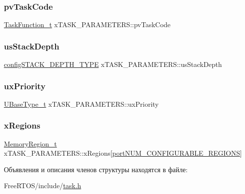 \subsubsection{\texorpdfstring{pvTaskCode}{pvTaskCode}}
{\footnotesize\ttfamily \mbox{\hyperlink{projdefs_8h_a9b32502ff92c255c686dacde53c1cba0}{Task\+Function\+\_\+t}} x\+T\+A\+S\+K\+\_\+\+P\+A\+R\+A\+M\+E\+T\+E\+R\+S\+::pv\+Task\+Code}

\mbox{\label{structx_t_a_s_k___p_a_r_a_m_e_t_e_r_s_ac2edb442cd1a9dc5435c7735ed99c83e}} 
\subsubsection{\texorpdfstring{usStackDepth}{usStackDepth}}
{\footnotesize\ttfamily \mbox{\hyperlink{_free_r_t_o_s_8h_ae4e85bffd36d76cf2796092f0ccd784a}{config\+S\+T\+A\+C\+K\+\_\+\+D\+E\+P\+T\+H\+\_\+\+T\+Y\+PE}} x\+T\+A\+S\+K\+\_\+\+P\+A\+R\+A\+M\+E\+T\+E\+R\+S\+::us\+Stack\+Depth}

\mbox{\label{structx_t_a_s_k___p_a_r_a_m_e_t_e_r_s_aa1aff14035db645e2bdcc85b3cdc9bab}} 
\subsubsection{\texorpdfstring{uxPriority}{uxPriority}}
{\footnotesize\ttfamily \mbox{\hyperlink{portmacro_8h_a646f89d4298e4f5afd522202b11cb2e6}{U\+Base\+Type\+\_\+t}} x\+T\+A\+S\+K\+\_\+\+P\+A\+R\+A\+M\+E\+T\+E\+R\+S\+::ux\+Priority}

\mbox{\label{structx_t_a_s_k___p_a_r_a_m_e_t_e_r_s_ae8b97c6b7a344bf09b066b0844844d66}} 
\subsubsection{\texorpdfstring{xRegions}{xRegions}}
{\footnotesize\ttfamily \mbox{\hyperlink{task_8h_af609504de4d78ff6f71477ae47c66e51}{Memory\+Region\+\_\+t}} x\+T\+A\+S\+K\+\_\+\+P\+A\+R\+A\+M\+E\+T\+E\+R\+S\+::x\+Regions\mbox{[}\mbox{\hyperlink{portable_8h_aca7e1a8a568a38b74cc9db10c8efebda}{port\+N\+U\+M\+\_\+\+C\+O\+N\+F\+I\+G\+U\+R\+A\+B\+L\+E\+\_\+\+R\+E\+G\+I\+O\+NS}}\mbox{]}}



Объявления и описания членов структуры находятся в файле\+:\begin{DoxyCompactItemize}
\item 
Free\+R\+T\+O\+S/include/\mbox{\hyperlink{task_8h}{task.\+h}}\end{DoxyCompactItemize}
